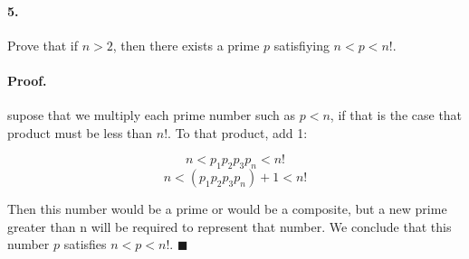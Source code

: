 \documentclass{article}
\begin{document}
\paragraph{5.} Prove that if $n>2$, then there exists a prime $p$ satisfiying $n<p<n!$.

\paragraph{Proof.} supose that we multiply each prime number such as  $p<n$, if that is the case that product must be less than $n!$. To that product, add 1:

$$n < p_1 p_2 p_3 p_n < n!$$
$$n < (p_1 p_2 p_3 p_n) + 1 < n!$$

Then this number would be a prime or would be a composite, but a new prime greater than n will be required to represent that number. We conclude that this number $p$ satisfies  $n < p < n!$. $\blacksquare$
\end{document}
